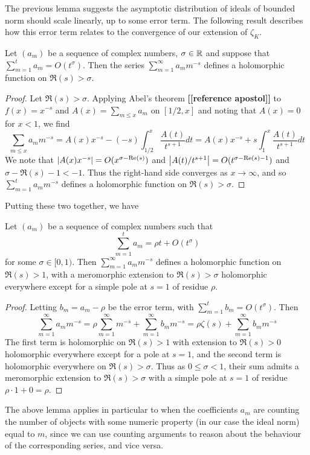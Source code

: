\documentclass[11pt]{report}
\begin{document}
The previous lemma suggests the asymptotic distribution of ideals of bounded norm should scale linearly, up to some error term. The following result describes how this error term relates to the convergence of our extension of $\zeta_K$.

\begin{lemma}
    Let $(a_m)$ be a sequence of complex numbers, $\sigma \in \mathbb{R}$ and suppose that $\sum_{m = 1}^t a_m = O(t^\sigma)$. Then the series $\sum_{m = 1}^\infty a_mm^{-s}$ defines a holomorphic function on $\Re(s) > \sigma$.
\end{lemma}
\begin{proof}
    Let $\Re(s) > \sigma$. Applying Abel's theorem \textbf{[[reference apostol]]} to $f(x) = x^{-s}$ and $A(x) = \sum_{m \leq x}a_m$ on $[1/2, x]$ and noting that $A(x) = 0$ for $x < 1$, we find
    $$
        \sum_{m \leq x}a_mm^{-s} = A(x)x^{-s} - (-s)\int_{1/2}^x \frac{A(t)}{t^{s + 1}}dt = A(x)x^{-s} + s\int_1^x\frac{A(t)}{t^{s + 1}}dt
    $$
    We note that $\left| A(x)x^{-s} \right| = O(x^{\sigma - \text{Re}(s)})$ and $\left| A(t)/t^{s + 1} \right| = O(t^{\sigma - \text{Re}(s) - 1})$ and $\sigma - \Re(s) - 1 < -1$. Thus the right-hand side converges as $x \to \infty$, and so $\sum_{m = 1}^t a_mm^{-s}$ defines a holomorphic function on $\Re(s) > \sigma$.
\end{proof}
Putting these two together, we have
\begin{lemma}\label{growthrate}
    Let $(a_m)$ be a sequence of complex numbers such that
    $$
        \sum_{m = 1}^t a_m = \rho t + O(t^\sigma)
    $$
    for some $\sigma \in [0, 1)$. Then $\sum_{m = 1}^\infty a_mm^{-s}$ defines a holomorphic function on $\Re(s) > 1$, with a meromorphic extension to $\Re(s) > \sigma$ holomorphic everywhere except for a simple pole at $s = 1$ of residue $\rho$.
\end{lemma}
\begin{proof}
    Letting $b_m = a_m - \rho$ be the error term, with $\sum_{m = 1}^t b_m = O(t^\sigma)$. Then
    $$
        \sum_{m = 1}^\infty a_mm^{-s} = \rho\sum_{m = 1}^\infty m^{-s} + \sum_{m = 1}^\infty b_mm^{-s} = \rho\zeta(s) + \sum_{m = 1}^\infty b_mm^{-s}
    $$
    The first term is holomorphic on $\Re(s) > 1$ with extension to $\Re(s) > 0$ holomorphic everywhere except for a pole at $s = 1$, and the second term is holomorphic everywhere on $\Re(s) > \sigma$. Thus as $0 \leq \sigma < 1$, their sum admits a meromorphic extension to $\Re(s) > \sigma$ with a simple pole at $s = 1$ of residue $\rho \cdot 1 + 0 = \rho$.
\end{proof}
The above lemma applies in particular to when the coefficients $a_m$ are counting the number of objects with some numeric property (in our case the ideal norm) equal to $m$, since we can use counting arguments to reason about the behaviour of the corresponding series, and vice versa.
\end{document}
